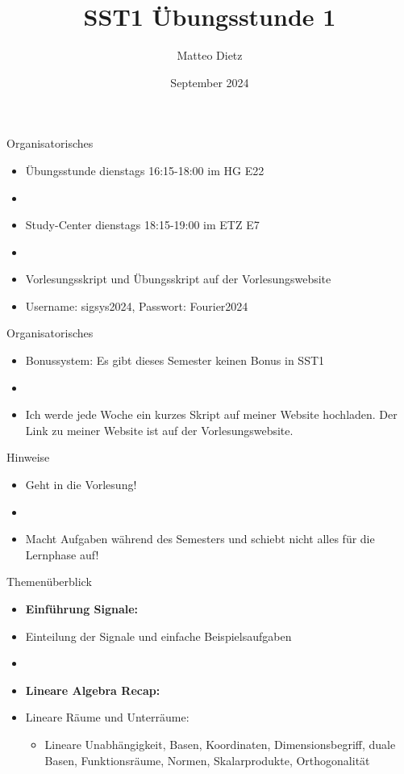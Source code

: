 \documentclass[14pt, aspectratio=169, handout]{beamer}
\title{SST1 Übungsstunde 1}
\author{Matteo Dietz}
\date{September 2024}
\begin{document}
\maketitle

\begin{frame}{Organisatorisches}
    \begin{itemize}
        \item Übungsstunde dienstags 16:15-18:00 im HG E22
        \item[]
        \item Study-Center dienstags 18:15-19:00 im ETZ E7
        \item[]
        \item Vorlesungsskript und Übungsskript auf der Vorlesungswebsite
        \item[] Username: sigsys2024, \hspace{10pt} Passwort: Fourier2024
    \end{itemize}
\end{frame}

\begin{frame}{Organisatorisches}
    \begin{itemize}
        \item Bonussystem: Es gibt dieses Semester keinen Bonus in SST1
        \item[] 
        \item Ich werde jede Woche ein kurzes Skript auf meiner Website hochladen. Der Link zu meiner Website ist auf der Vorlesungswebsite.
    \end{itemize}
\end{frame}

\begin{frame}{Hinweise}
\begin{itemize}
    \item \alert{Geht in die Vorlesung!}
    \item[] 
    \item \alert{Macht Aufgaben während des Semesters und schiebt nicht alles für die Lernphase auf!}
\end{itemize}
\end{frame}

\begin{frame}{Themenüberblick}
    \begin{itemize}
    \item \textbf{Einführung Signale:}
    \item[] Einteilung der Signale und einfache Beispielsaufgaben
    \item[] 
    \item \textbf{Lineare Algebra Recap:}
    \item[] Lineare Räume und Unterräume: \begin{itemize}
        \item[] Lineare Unabhängigkeit, Basen, Koordinaten, Dimensionsbegriff, duale Basen, Funktionsräume, Normen, Skalarprodukte, Orthogonalität
    \end{itemize}
\end{itemize}
\end{frame}
\end{document}
